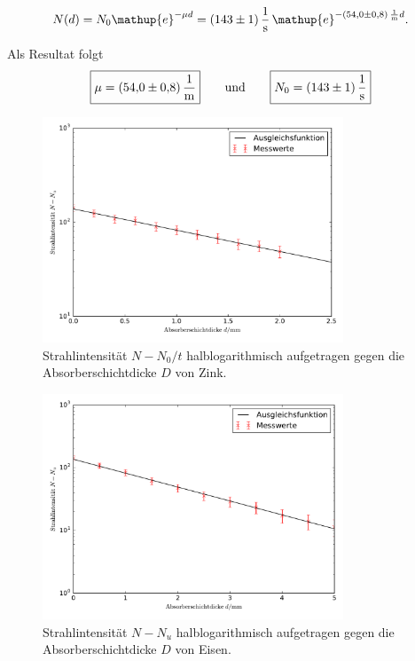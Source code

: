 \documentclass[
  bibliography=totoc,     %
  captions=tableheading,  %
  titlepage=firstiscover, %
]{scrartcl}
\begin{document}
\begin{equation}
    N(d) = N_0\mathup{e}^{-{\mu}d} = \SI{143(1)}{\frac{1}{\second}}\,\mathup{e}^{-\SI{54.0(8)}{\frac{1}{\metre}}d}.
    \label{eq:absorption_eisen}
\end{equation}

Als Resultat folgt
%
\begin{equation}
    \boxed{\mu = \SI{54.0(8)}{\frac{1}{\metre}}} \qquad\text{und}\qquad \boxed{N_0 = \SI{143(1)}{\frac{1}{\second}}}
\end{equation}

\begin{figure}[H]
    \centering
    \includegraphics[width=0.80\textwidth]{plot_Zink.pdf}
    \caption{Strahlintensität $N-N_0/t$ halblogarithmisch aufgetragen gegen die Absorberschichtdicke $D$ von Zink.}
    \label{fig:plot_zink}
\end{figure}

\begin{figure}[H]
    \centering
    \includegraphics[width=0.80\textwidth]{plot_Eisen.pdf}
    \caption{Strahlintensität ${N-N_u}$ halblogarithmisch aufgetragen gegen die Absorberschichtdicke $D$ von Eisen.}
    \label{fig:plot_eisen}
\end{figure}
\end{document}
